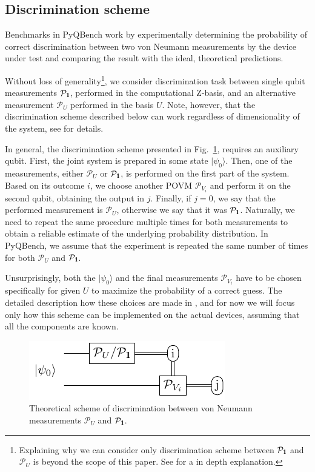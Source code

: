 \documentclass[preprint,12pt, a4paper, dvipsnames]{elsarticle}
\newcommand{\ket}[1]{\ensuremath{|#1\rangle}}
\newcommand{\1}{{\rm 1\hspace{-0.9mm}l}}
\newcommand{\Id}{{\rm 1\hspace{-0.9mm}l}}
\newcommand{\PP}{\mathcal{P}}
\theoremstyle{definition}
\begin{document}
\subsection{Discrimination scheme}\label{sec:discrimination-scheme}

Benchmarks in PyQBench work by experimentally determining the probability of correct discrimination
between two von Neumann measurements by the device under test and comparing the result with the
ideal, theoretical predictions.

Without loss of generality\footnote{Explaining why we can consider only discrimination scheme between $\PP_{\Id}$ and $\PP_{U}$ is beyond the scope of this paper. See \cite{puchala2018strategies} for a in depth explanation.}, we consider discrimination task between single qubit measurements
$\PP_\Id$, performed in the computational Z-basis, and an alternative measurement $\PP_U$ performed
in the basis $U$. Note, however, that the discrimination scheme described below can work
regardless of dimensionality of the system, see \cite{puchala2018strategies} for details.

In general, the discrimination scheme presented in Fig.~\ref{fig:theoretical_scheme}, requires an
auxiliary qubit. First, the joint system is prepared in some state $\ket{\psi_0}$. Then, one of the 
measurements,  either $\PP_U$ or $\PP_\1$, is performed on the first part of the system. Based on its
outcome $i$, we choose another POVM $\mathcal{P}_{V_i}$ and perform it on the second
qubit, obtaining the output in $j$. Finally, if $j=0$, we say that the performed measurement is
$\mathcal{P}_U$, otherwise we say that it was $\mathcal{P}_\Id$. Naturally, we need to repeat the
same procedure multiple times for both measurements to obtain a reliable estimate of the underlying
probability distribution. In PyQBench, we assume that the experiment is repeated the same number of
times for both $\PP_U$ and $\PP_\Id$.

Unsurprisingly, both the
$\ket{\psi_0}$ and the final measurements $\mathcal{P}_{V_i}$ have to be chosen specifically for
given $U$ to maximize the probability of a correct guess. The detailed description  how these
choices are made in \cite{watrous}, and for now we will focus
only how this scheme can be implemented on the actual devices, assuming that all the components are known.

\begin{figure}[h!]
	\centering
	\includegraphics[scale=1.7]{pics/theoretical_scheme}
	\caption{Theoretical  scheme of discrimination  between von Neumann measurements $\PP_{U}$ and $\PP_\Id$. }
	\label{fig:theoretical_scheme}
\end{figure}
\end{document}
